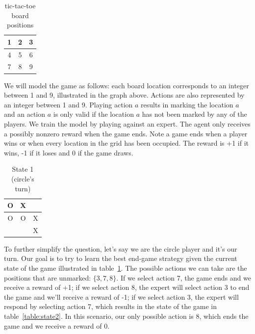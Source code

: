 \documentclass[11pt,addpoints,answers]{exam}
\begin{document}
\begin{questions}
\begin{table}[H]
\begin{center}
  \begin{tabular}{  c | c | c  }
    1 & 2 & 3\\ \hline
    4 & 5 & 6 \\ \hline
    7 & 8 & 9 \\ 
  \end{tabular}
 \caption{tic-tac-toe board positions}
\end{center}
\end{table}

We will model the game as follows: each board location corresponds to an integer between 1 and 9, illustrated in the graph above. Actions are also represented by an integer between 1 and 9. Playing action $a$ results in marking the location $a$ and an action $a$ is only valid if the location $a$ has not been marked by any of the players. We train the model by playing against an expert. The agent only receives a possibly nonzero reward when the game ends. Note a game ends when a player wins or when every location in the grid has been occupied. The reward is +1 if it wins, -1 if it loses and 0 if the game draws.

\begin{table}[H]
\begin{center}
  \begin{tabular}{  c | c | c  }
    O & X &  \\ \hline
    O & O & X \\ \hline
      &   & X \\ 
  \end{tabular}
 \caption{State 1 (circle's turn)}
 \label{table:state1}
\end{center}
\end{table}

To further simplify the question, let's say we are the circle player and it's our turn. Our goal is to try to learn the best end-game strategy given the current state of the game illustrated in table~\ref{table:state1}. The possible actions we can take are the positions that are unmarked: $\big\{ 3, 7, 8 \big\}$. If we select action 7, the game ends and we receive a reward of +1; if we select action 8, the expert will select action 3 to end the game and we'll receive a reward of -1; if we select action 3, the expert will respond by selecting action 7, which results in the state of the game in table~\ref{table:state2}. In this scenario, our only possible action is 8, which ends the game and we receive a reward of 0.


\end{questions}
\end{document}
